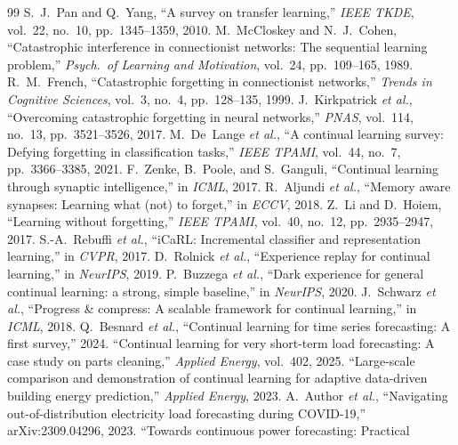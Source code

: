\documentclass[conference]{IEEEtran}
\begin{document}
\begin{thebibliography}{99}
 S.~J.~Pan and Q.~Yang, ``A survey on transfer learning,''
\emph{IEEE TKDE}, vol.~22, no.~10, pp.~1345--1359, 2010.
 M.~McCloskey and N.~J.~Cohen, ``Catastrophic interference
in connectionist networks: The sequential learning problem,'' \emph{Psych.\ of
Learning and Motivation}, vol.~24, pp.~109--165, 1989.
 R.~M.~French, ``Catastrophic forgetting in connectionist
networks,'' \emph{Trends in Cognitive Sciences}, vol.~3, no.~4, pp.~128--135, 1999.
 J.~Kirkpatrick \emph{et al.}, ``Overcoming catastrophic
forgetting in neural networks,'' \emph{PNAS}, vol.~114, no.~13, pp.~3521--3526, 2017.
 M.~De~Lange \emph{et al.}, ``A continual learning survey:
Defying forgetting in classification tasks,'' \emph{IEEE TPAMI}, vol.~44, no.~7,
pp.~3366--3385, 2021.
 F.~Zenke, B.~Poole, and S.~Ganguli, ``Continual learning
through synaptic intelligence,'' in \emph{ICML}, 2017.
 R.~Aljundi \emph{et al.}, ``Memory aware synapses: Learning
what (not) to forget,'' in \emph{ECCV}, 2018.
 Z.~Li and D.~Hoiem, ``Learning without forgetting,''
\emph{IEEE TPAMI}, vol.~40, no.~12, pp.~2935--2947, 2017.
 S.-A.~Rebuffi \emph{et al.}, ``iCaRL: Incremental classifier
and representation learning,'' in \emph{CVPR}, 2017.
 D.~Rolnick \emph{et al.}, ``Experience replay for continual
learning,'' in \emph{NeurIPS}, 2019.
 P.~Buzzega \emph{et al.}, ``Dark experience for general
continual learning: a strong, simple baseline,'' in \emph{NeurIPS}, 2020.
 J.~Schwarz \emph{et al.}, ``Progress \& compress: A scalable
framework for continual learning,'' in \emph{ICML}, 2018.
 Q.~Besnard \emph{et al.}, ``Continual learning for
time series forecasting: A first survey,'' 2024.
 ``Continual learning for very short-term load
forecasting: A case study on parts cleaning,'' \emph{Applied Energy}, vol.~402,
2025.
 ``Large-scale comparison and demonstration of
continual learning for adaptive data-driven building energy prediction,''
\emph{Applied Energy}, 2023.
 A.~Author \emph{et al.}, ``Navigating out-of-distribution
electricity load forecasting during COVID-19,'' arXiv:2309.04296, 2023.
 ``Towards continuous power forecasting: Practical

\end{thebibliography}
\end{document}
